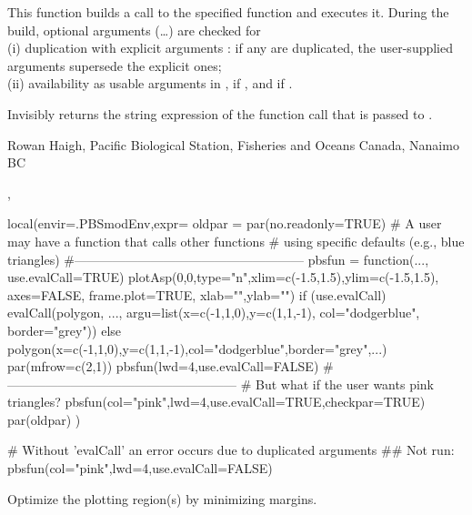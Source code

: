\documentclass[letterpaper]{book}
\begin{document}
%
\begin{Details}\relax
This function builds a call to the specified function and executes it. 
During the build, optional arguments (\dots) are checked for \\{}
(i) duplication with explicit arguments : if any are duplicated,
the user-supplied arguments supersede the explicit ones; \\{}
(ii) availability as usable arguments in ,  if
, and  if .
\end{Details}
%
\begin{Value}
Invisibly returns the string expression of the function call that is
passed to .
\end{Value}
%
\begin{Author}\relax
Rowan Haigh, Pacific Biological Station, Fisheries and Oceans Canada, Nanaimo BC
\end{Author}
%
\begin{SeeAlso}\relax
{},   
\end{SeeAlso}
%
\begin{Examples}
\begin{ExampleCode}
local(envir=.PBSmodEnv,expr={
  oldpar = par(no.readonly=TRUE)
  # A user may have a function that calls other functions
  # using specific defaults (e.g., blue triangles)
  #------------------------------------------------------
  pbsfun = function(..., use.evalCall=TRUE) {
    plotAsp(0,0,type="n",xlim=c(-1.5,1.5),ylim=c(-1.5,1.5),
      axes=FALSE, frame.plot=TRUE, xlab="",ylab="")
    if (use.evalCall)
      evalCall(polygon, ...,
        argu=list(x=c(-1,1,0),y=c(1,1,-1), col="dodgerblue", border="grey"))
    else
      polygon(x=c(-1,1,0),y=c(1,1,-1),col="dodgerblue",border="grey",...) 
  }
  par(mfrow=c(2,1))
  pbsfun(lwd=4,use.evalCall=FALSE)
  #------------------------------------------------------
  # But what if the user wants pink triangles?
  pbsfun(col="pink",lwd=4,use.evalCall=TRUE,checkpar=TRUE)
  par(oldpar)
})

# Without 'evalCall' an error occurs due to duplicated arguments
## Not run: pbsfun(col="pink",lwd=4,use.evalCall=FALSE)
\end{ExampleCode}
\end{Examples}
%
\begin{Description}\relax
Optimize the plotting region(s) by minimizing margins.
\end{Description}
\end{document}
